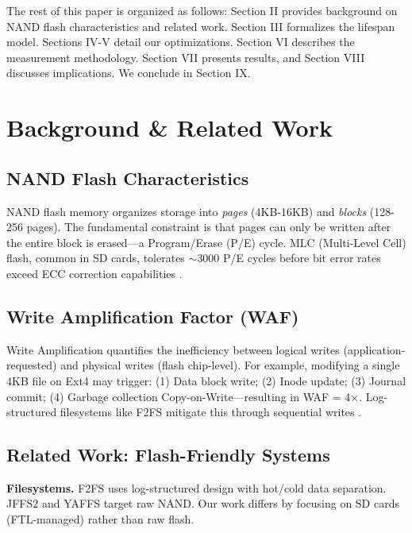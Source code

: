 \documentclass[conference]{IEEEtran}
\begin{document}
The rest of this paper is organized as follows: Section II provides background on NAND flash characteristics and related work. Section III formalizes the lifespan model. Sections IV-V detail our optimizations. Section VI describes the measurement methodology. Section VII presents results, and Section VIII discusses implications. We conclude in Section IX.

\section{Background \& Related Work}

\subsection{NAND Flash Characteristics}

NAND flash memory organizes storage into \textit{pages} (4KB-16KB) and \textit{blocks} (128-256 pages). The fundamental constraint is that pages can only be written after the entire block is erased—a Program/Erase (P/E) cycle. MLC (Multi-Level Cell) flash, common in SD cards, tolerates $\sim$3000 P/E cycles before bit error rates exceed ECC correction capabilities \cite{b4}.

\subsection{Write Amplification Factor (WAF)}

Write Amplification quantifies the inefficiency between logical writes (application-requested) and physical writes (flash chip-level). For example, modifying a single 4KB file on Ext4 may trigger: (1) Data block write; (2) Inode update; (3) Journal commit; (4) Garbage collection Copy-on-Write—resulting in WAF = 4$\times$. Log-structured filesystems like F2FS mitigate this through sequential writes \cite{b1}.

\subsection{Related Work: Flash-Friendly Systems}

\textbf{Filesystems.} F2FS \cite{b1} uses log-structured design with hot/cold data separation. JFFS2 and YAFFS target raw NAND. Our work differs by focusing on SD cards (FTL-managed) rather than raw flash.
\end{document}

